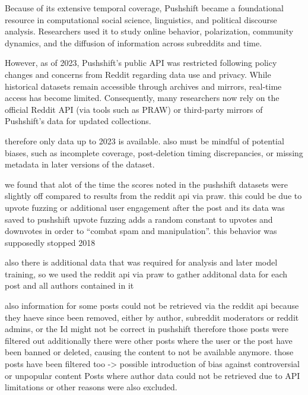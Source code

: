 Because of its extensive temporal coverage, Pushshift became a foundational resource in computational social science, linguistics, and political discourse analysis. Researchers used it to study online behavior, polarization, community dynamics, and the diffusion of information across subreddits and time.

However, as of 2023, Pushshift’s public API was restricted following policy changes and concerns from Reddit regarding data use and privacy. While historical datasets remain accessible through archives and mirrors, real-time access has become limited. Consequently, many researchers now rely on the official Reddit API (via tools such as PRAW) or third-party mirrors of Pushshift’s data for updated collections.

therefore only data up to 2023 is available. also must be mindful of potential biases, such as incomplete coverage, post-deletion timing discrepancies, or missing metadata in later versions of the dataset.

we found that alot of the time the scores noted in the pushshift datasets were slightly off compared to results from the reddit api via praw. this could be due to upvote fuzzing or additional user engagement after the post and its data was saved to pushshift 
upvote fuzzing adds a random constant to upvotes and downvotes in order to ``combat spam and manipulation''. this behavior was supposedly stopped 2018 \cite{stoddard2015popularity}

also there is additional data that was required for analysis and later model training, so we used the reddit api via praw to gather additonal data for each post and all authors contained in it

also information for some posts could not be retrieved via the reddit api because they haeve since been removed, either by author, subreddit moderators or reddit admins, or the Id might not be correct in pushshift
therefore those posts were filtered out
additionally there were other posts where the user or the post have been banned or deleted, causing the content to not be available anymore. those posts have been filtered too
-> possible introduction of bias against controversial or unpopular content
Posts where author data could not be retrieved due to API limitations or other reasons were also excluded. 




